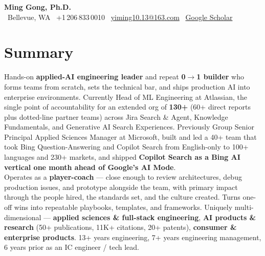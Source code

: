 \documentclass[10.5pt,letterpaper]{article}
\begin{document}
\begin{center}
  {\LARGE\bfseries\color{blue!60!black} Ming Gong, Ph.D.}\\[3pt]
  \faMapMarker* \ Bellevue, WA \quad \textbar \quad
  \faPhone \ +1\,206\,833\,0010 \quad \textbar \quad
  \faEnvelope \ \href{mailto:yiming10.13@163.com}{yiming10.13@163.com} \quad \textbar \quad
  \faGraduationCap \ \href{https://scholar.google.com/citations?user=c7JEFwsAAAAJ}{Google Scholar}
\end{center}

\section*{Summary}
Hands-on \textbf{applied-AI engineering leader} and repeat \textbf{0$\to$1 builder} who forms teams from scratch, sets the technical bar, and ships production AI into enterprise environments. Currently Head of ML Engineering at Atlassian, the single point of accountability for an extended org of \textbf{130+} (60+ direct reports plus dotted-line partner teams) across Jira Search \& Agent, Knowledge Fundamentals, and Generative AI Search Experiences. Previously Group Senior Principal Applied Sciences Manager at Microsoft, built and led a 40+ team that took Bing Question-Answering and Copilot Search from English-only to 100+ languages and 230+ markets, and shipped \textbf{Copilot Search as a Bing AI vertical one month ahead of Google's AI Mode}.\\[4pt]
Operates as a \textbf{player-coach} --- close enough to review architectures, debug production issues, and prototype alongside the team, with primary impact through the people hired, the standards set, and the culture created. Turns one-off wins into repeatable playbooks, templates, and frameworks. Uniquely multi-dimensional --- \textbf{applied sciences \& full-stack engineering}, \textbf{AI products \& research} (50+ publications, 11K+ citations, 20+ patents), \textbf{consumer \& enterprise products}. 13+ years engineering, 7+ years engineering management, 6 years prior as an IC engineer / tech lead.

\end{document}
